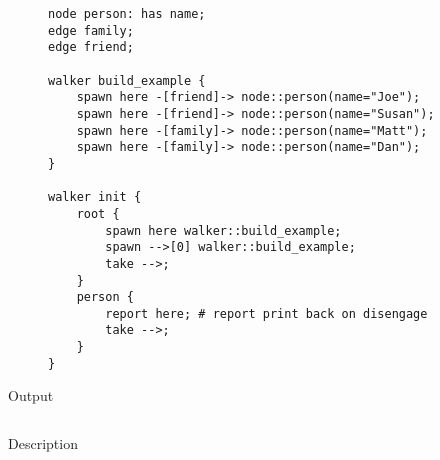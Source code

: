 \begin{description}
    \begin{lstlisting}[caption={Generating reports throughout a walk}]
node person: has name;
edge family;
edge friend;

walker build_example {
    spawn here -[friend]-> node::person(name="Joe");
    spawn here -[friend]-> node::person(name="Susan");
    spawn here -[family]-> node::person(name="Matt");
    spawn here -[family]-> node::person(name="Dan");
}

walker init {
    root {
        spawn here walker::build_example;
        spawn -->[0] walker::build_example;
        take -->;
    }
    person {
        report here; # report print back on disengage
        take -->;
    }
}
    \end{lstlisting}
    \item[Output] \texttt{}
          \begin{lstlisting}[language=shell]
        \end{lstlisting}
    \item[Description] \texttt{}
\end{description}